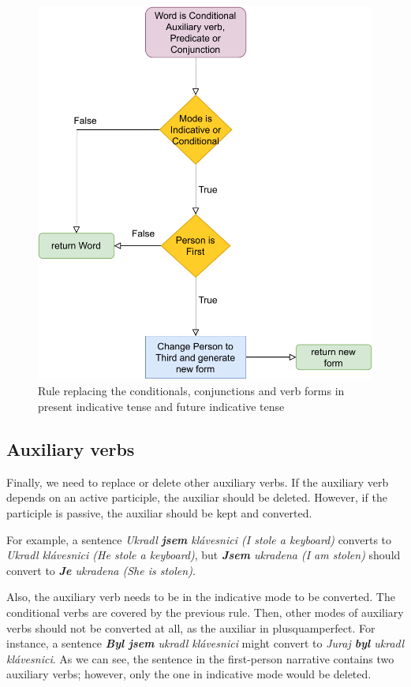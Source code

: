 \begin{figure}[!htbp]
\includegraphics[width=\textwidth]{data/Icher-Predicate-Rule.pdf}
\caption{Rule replacing the conditionals, conjunctions and verb forms in present indicative tense and future indicative tense}
\label{fig:icher-predicate-rule}
\end{figure}

\subsection{Auxiliary verbs} \label{sec:aux-del}

Finally, we need to replace or delete other auxiliary verbs. If the auxiliary verb depends on an active participle, the auxiliar should be deleted. However, if the participle is passive, the auxiliar should be kept and converted.

For example, a sentence \emph{Ukradl \textbf{jsem} klávesnici (I stole a keyboard)} converts to \emph{Ukradl klávesnici (He stole a keyboard)}, but \emph{\textbf{Jsem} ukradena (I am stolen)} should convert to \emph{\textbf{Je} ukradena (She is stolen)}.

Also, the auxiliary verb needs to be in the indicative mode to be converted. The conditional verbs are covered by the previous rule. Then, other modes of auxiliary verbs should not be converted at all, as the auxiliar in plusquamperfect. For instance, a sentence \emph{\textbf{Byl jsem} ukradl klávesnici} might convert to \emph{Juraj \textbf{byl} ukradl klávesnici}. As we can see, the sentence in the first-person narrative contains two auxiliary verbs; however, only the one in indicative mode would be deleted.

